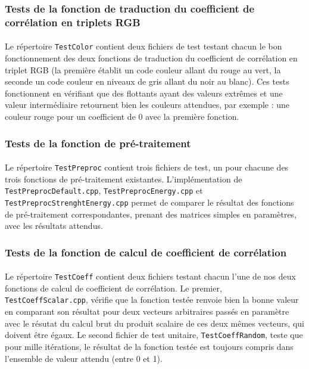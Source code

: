 \subsubsection{Tests de la fonction de traduction du coefficient de corrélation en triplets RGB}
\paragraph{}
Le répertoire \verb!TestColor! contient deux fichiers de test testant
chacun le bon fonctionnement des deux fonctions de traduction du
coefficient de corrélation en triplet RGB (la première établit un code
couleur allant du rouge au vert, la seconde un code couleur en niveaux
de gris allant du noir au blanc). Ces tests fonctionnent en vérifiant
que des flottants ayant des valeurs extrêmes et une valeur
intermédiaire retournent bien les couleurs attendues, par exemple :
une couleur rouge pour un coefficient de 0 avec la première fonction.

\subsubsection{Tests de la fonction de pré-traitement}
\paragraph{}
Le répertoire \verb!TestPreproc! contient trois fichiers de test, un
pour chacune des trois fonctions de pré-traitement
existantes. L'implémentation de \verb!TestPreprocDefault.cpp!,
\verb!TestPreprocEnergy.cpp! et \verb!TestPreprocStrenghtEnergy.cpp!
permet de comparer le résultat des fonctions de pré-traitement
correspondantes, prenant des matrices simples en paramètres, avec les
résultats attendus.

\subsubsection{Tests de la fonction de calcul de coefficient de corrélation}
\paragraph{}
Le répertoire \verb!TestCoeff! contient deux fichiers testant chacun
l'une de nos deux fonctions de calcul de coefficient de
corrélation. Le premier, \verb!TestCoeffScalar.cpp!, vérifie que la
fonction testée renvoie bien la bonne valeur en comparant son résultat
pour deux vecteurs arbitraires passés en paramètre avec le résutat du
calcul brut du produit scalaire de ces deux mêmes vecteurs, qui
doivent être égaux. Le second fichier de test unitaire,
\verb!TestCoeffRandom!, teste que pour mille itérations, le résultat
de la fonction testée est toujours compris dans l'ensemble de valeur
attendu (entre 0 et 1).

